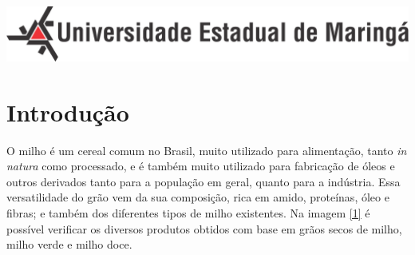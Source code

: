 \documentclass[
	12pt,				%
	openright,			%
	oneside,			%
	a4paper,			%
	english,			%
	french,				%
	spanish,			%
	brazil				%
	]{abntex2}
\begin{document}
\begin{minipage}[c][0cm][c]{0cm} %

\centering

\includegraphics[scale=0.45]{../../Pictures/uem-modelo-04.png}  
\end{minipage}


\frenchspacing 


\imprimircapa



 
 


\tableofcontents*
\cleardoublepage

\textual

\chapter{Introdução}

O milho é um cereal comum no Brasil, muito utilizado para alimentação, tanto \textit{in natura} como processado, e é também muito utilizado para fabricação de óleos e outros derivados tanto para a população em geral, quanto para a indústria. Essa versatilidade do grão vem da sua composição, rica em amido, proteínas, óleo e fibras; e também dos diferentes tipos de milho existentes. Na imagem \ref{1} é possível verificar os diversos produtos obtidos com base em grãos secos de milho, milho verde e milho doce.
\end{document}
